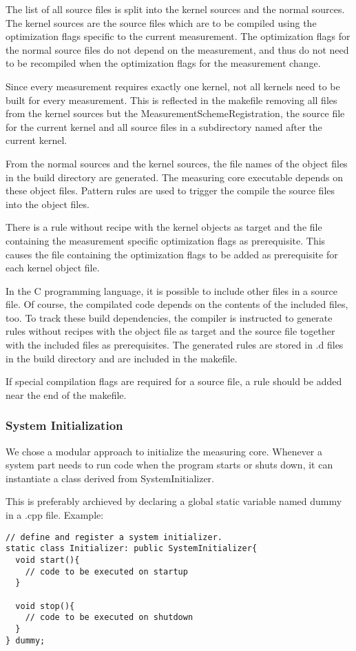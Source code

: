 \documentclass[a4paper,12pt]{article}
\newcommand{\file}[1]{}
\begin{document}
The list of all source files is split into the kernel sources and the normal sources. The kernel sources are the source files which are to be compiled using the optimization flags specific to the current measurement. The optimization flags for the normal source files do not depend on the measurement, and thus do not need to be recompiled when the optimization flags for the measurement change.

Since every measurement requires exactly one kernel, not all kernels need to be built for every measurement. This is reflected in the makefile removing all files from the kernel sources but the MeasurementSchemeRegistration, the source file for the current kernel and all source files in a subdirectory named after the current kernel.

From the normal sources and the kernel sources, the file names of the object files in the build directory are generated. The measuring core executable depends on these object files. Pattern rules are used to trigger the compile the source files into the object files.

There is a rule without recipe with the kernel objects as target and the file containing the measurement specific optimization flags as prerequisite. This causes the file containing the optimization flags to be added as prerequisite for each kernel object file.

In the C programming language, it is possible to include other files in a source file. Of course, the compilated code depends on the contents of the included files, too. To track these build dependencies, the compiler is instructed to generate rules without recipes with the object file as target and the source file together with the included files as prerequisites. The generated rules are stored in .d files in the build directory and are included in the makefile.

If special compilation flags are required for a source file, a rule should be added near the end of the makefile.

\subsubsection{System Initialization}
We chose a modular approach to initialize the measuring core. Whenever a system part needs to run code when the program starts or shuts down, it can instantiate a class derived from SystemInitializer.
\file{measuringCore/baseClasses/SystemInitializer.h}
This is preferably archieved by declaring a global static variable named dummy in a .cpp file. Example:
\begin{verbatim}
// define and register a system initializer.
static class Initializer: public SystemInitializer{
  void start(){
    // code to be executed on startup
  }

  void stop(){
    // code to be executed on shutdown
  }
} dummy;
\end{verbatim}
\end{document}
